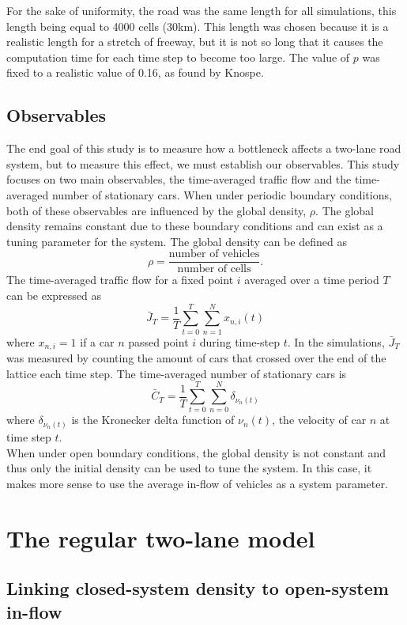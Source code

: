 \documentclass[11pt]{article}
\begin{document}
	For the sake of uniformity, the road was the same length for all simulations, this length being equal to 4000 cells (30km). This length was chosen because it is a realistic length for a stretch of freeway, but it is not so long that it causes the computation time for each time step to become too large. The value of $p$ was fixed to a realistic value of 0.16, as found by Knospe\cite{duepublico_mods_00005368}. \\
	
	\subsection{Observables}\label{subsec:obs}
	
	The end goal of this study is to measure how a bottleneck affects a two-lane road system, but to measure this effect, we must establish our observables. This study focuses on two main observables, the time-averaged traffic flow and the time-averaged number of stationary cars. When under periodic boundary conditions, both of these observables are influenced by the global density, $\rho$. The global density remains constant due to these boundary conditions and can exist as a tuning parameter for the system. The global density can be defined as 
	\[ \rho = \frac{\text{number of vehicles}}{\text{number of cells}}. \]
	The time-averaged traffic flow for a fixed point $i$ averaged over a time period $T$ can be expressed as 
	\[ \bar{J}_T = \frac{1}{T} \sum^{T}_{t=0} \sum^{N}_{n=1} x_{n,i}(t) \]
	where $x_{n,i} = 1$ if a car $n$ passed point $i$ during time-step $t$. In the simulations, $\bar{J}_T$ was measured by counting the amount of cars that crossed over the end of the lattice each time step.
	The time-averaged number of stationary cars is 
	\[ \bar{C}_T = \frac{1}{T} \sum^{T}_{t=0} \sum^{N}_{n=0} \delta_{\nu_n(t)} \]
	where $\delta_{\nu_n(t)}$ is the Kronecker delta function of $\nu_{n}(t)$, the velocity of car $n$ at time step $t$. \\
	When under open boundary conditions, the global density is not constant and thus only the initial density can be used to tune the system. In this case, it makes more sense to use the average in-flow of vehicles as a system parameter.
	
	\section{The regular two-lane model} \label{sec:regularNaSch}
	
	\subsection{Linking closed-system density to open-system in-flow}\label{subsec:closeopen}
	
\end{document}
